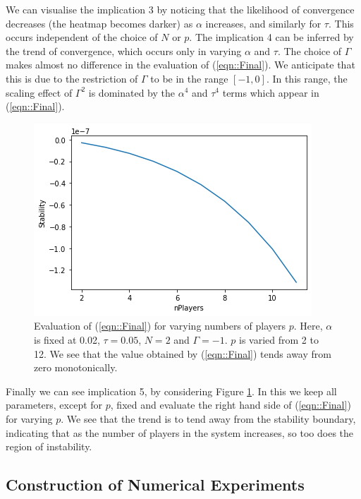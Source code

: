 \documentclass[sigconf,anonymous]{aamas}
\begin{document}
We can visualise the implication 3 by noticing that the likelihood of convergence decreases (the heatmap becomes darker) as $\alpha$ increases, and similarly for $\tau$. This occurs independent of the choice of $N$ or $p$. The implication 4 can be inferred by the trend of convergence, which occurs only in varying $\alpha$ and $\tau$. The choice of $\Gamma$
makes almost no difference in the evaluation of (\ref{eqn::Final}). We anticipate that this is due to the restriction of $\Gamma$ to be in the range $[-1, 0]$. In this range, the scaling effect of $\Gamma^2$ is dominated by the $\alpha^4$ and $\tau^4$ terms which appear in (\ref{eqn::Final}).

\begin{figure}[t]
    \centering
    \includegraphics[width = 0.9 \linewidth]{Figures/p variation.png}
    \caption{Evaluation of (\ref{eqn::Final}) for varying numbers of players $p$. Here, $\alpha$ is fixed at 0.02, $\tau = 0.05$, $N = 2$ and $\Gamma = -1$. $p$ is varied from 2 to 12. We see that the value obtained by (\ref{eqn::Final}) tends away from zero monotonically.}
    \label{fig:pvariation}
\end{figure}

Finally we can see implication 5, by considering Figure \ref{fig:pvariation}. In this we keep all parameters, except for $p$, fixed and evaluate the right hand side of (\ref{eqn::Final}) for varying $p$. We see that the trend is to tend away from the stability boundary, indicating that as the number of players in the system increases, so too does the region of instability.

\subsection{Construction of Numerical Experiments}
\end{document}
